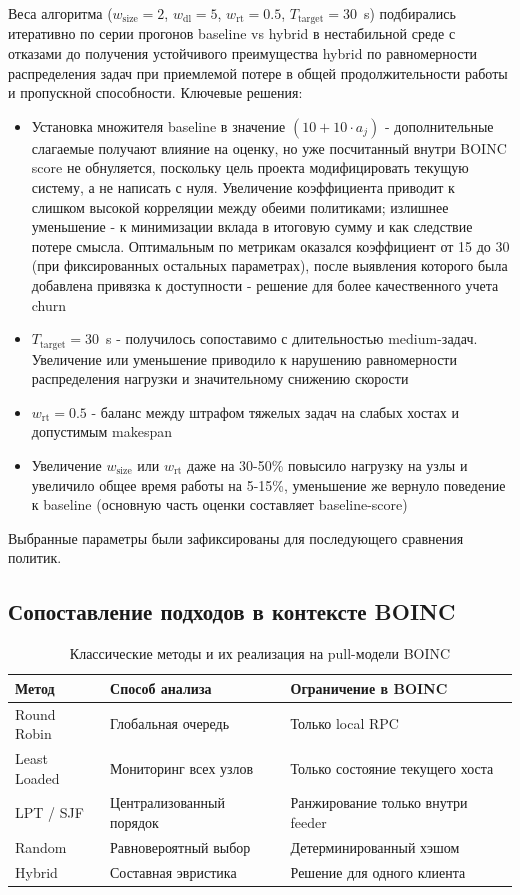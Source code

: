 \documentclass[a4paper,12pt]{extarticle}
\begin{document}
Веса алгоритма ($w_{\text{size}}=2$, $w_{\text{dl}}=5$, $w_{\text{rt}}=0.5$, $T_{\text{target}}=30$~s) подбирались итеративно по серии прогонов baseline vs hybrid в нестабильной среде с отказами до получения устойчивого преимущества hybrid по равномерности распределения задач при приемлемой потере в общей продолжительности работы и пропускной способности. Ключевые решения:
\begin{itemize}
    \item Установка множителя baseline в значение $(10 + 10\cdot a_j)$ - дополнительные слагаемые получают влияние на оценку, но уже посчитанный внутри BOINC score не обнуляется, поскольку цель проекта модифицировать текущую систему, а не написать с нуля. Увеличение коэффициента приводит к слишком высокой корреляции между обеими политиками; излишнее уменьшение - к минимизации вклада в итоговую сумму и как следствие потере смысла. Оптимальным по метрикам оказался коэффициент от 15 до 30 (при фиксированных остальных параметрах), после выявления которого была добавлена привязка к доступности - решение для более качественного учета churn
    \item $T_{\text{target}}=30$~s - получилось сопоставимо с длительностью medium-задач. Увеличение или уменьшение приводило к нарушению равномерности распределения нагрузки и значительному снижению скорости
    \item $w_{\text{rt}}=0.5$ - баланс между штрафом тяжелых задач на слабых хостах и допустимым makespan
    \item Увеличение $w_{\text{size}}$ или $w_{\text{rt}}$ даже на 30-50\% повысило нагрузку на узлы и увеличило общее время работы на 5-15\%, уменьшение же вернуло поведение к baseline (основную часть оценки составляет baseline-score)
\end{itemize}

Выбранные параметры были зафиксированы для последующего сравнения политик.

\subsection{Сопоставление подходов в контексте BOINC}
\begin{table}[H]
    \centering
    \caption{Классические методы и их реализация на pull-модели BOINC}
    \footnotesize
    \begin{tabular}{p{3.0cm} p{4.3cm} p{7.0cm}}
        \toprule
        Метод & Способ анализа & Ограничение в BOINC \\
        \midrule
        Round Robin & Глобальная очередь & Только local RPC \\
        Least Loaded & Мониторинг всех узлов & Только состояние текущего хоста \\
        LPT / SJF & Централизованный порядок & Ранжирование только внутри feeder \\
        Random & Равновероятный выбор & Детерминированный хэшом \\
        Hybrid & Составная эвристика & Решение для одного клиента \\
        \bottomrule
    \end{tabular}
\end{table}
\end{document}
